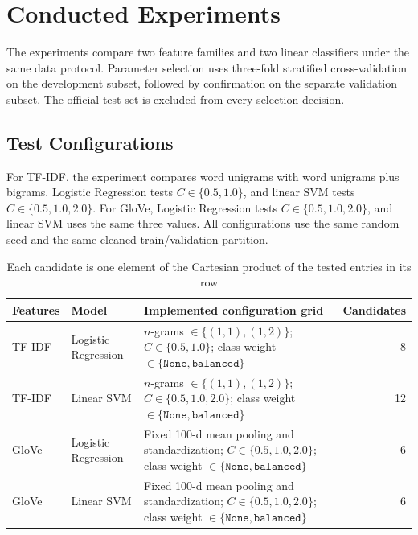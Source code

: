 \section{Conducted Experiments}
\label{sec:experiments}

The experiments compare two feature families and two linear classifiers under the same data protocol. Parameter selection uses three-fold stratified cross-validation on the development subset, followed by confirmation on the separate validation subset. The official test set is excluded from every selection decision.

\subsection{Test Configurations}

For TF-IDF, the experiment compares word unigrams with word unigrams plus bigrams. 
Logistic Regression tests $C \in \{0.5,1.0\}$, and linear SVM tests $C \in \{0.5,1.0,2.0\}$. 
For GloVe, Logistic Regression tests $C \in \{0.5,1.0,2.0\}$, and linear SVM uses the same 
three values. All configurations use the same random seed and the same cleaned train/validation partition.

\begin{table}[H]
\centering
\small
\begin{tabularx}{\textwidth}{|l|l|X|r|}
\hline
Features & Model & Implemented configuration grid & Candidates \\
\hline
TF-IDF & Logistic Regression & $n$-grams $\in\{(1,1),(1,2)\}$; $C\in\{0.5,1.0\}$; class weight $\in\{\texttt{None},\texttt{balanced}\}$ & 8 \\
\hline
TF-IDF & Linear SVM & $n$-grams $\in\{(1,1),(1,2)\}$; $C\in\{0.5,1.0,2.0\}$; class weight $\in\{\texttt{None},\texttt{balanced}\}$ & 12 \\
\hline
GloVe & Logistic Regression & Fixed 100-d mean pooling and standardization; $C\in\{0.5,1.0,2.0\}$; class weight $\in\{\texttt{None},\texttt{balanced}\}$ & 6 \\
\hline
GloVe & Linear SVM & Fixed 100-d mean pooling and standardization; $C\in\{0.5,1.0,2.0\}$; class weight $\in\{\texttt{None},\texttt{balanced}\}$ & 6 \\
\hline
\end{tabularx}
\caption{Each candidate is one element of the Cartesian product of the tested entries in its row}
\label{tab:tested-configurations}
\end{table}

